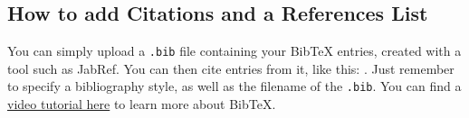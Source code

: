 \documentclass{article}
\begin{document}
\subsection{How to add Citations and a References List}

You can simply upload a \verb|.bib| file containing your BibTeX entries, created with a tool such as JabRef. You can then cite entries from it, like this: \cite{greenwade93}. Just remember to specify a bibliography style, as well as the filename of the \verb|.bib|. You can find a \href{https://www.overleaf.com/help/97-how-to-include-a-bibliography-using-bibtex}{video tutorial here} to learn more about BibTeX.




\end{document}
